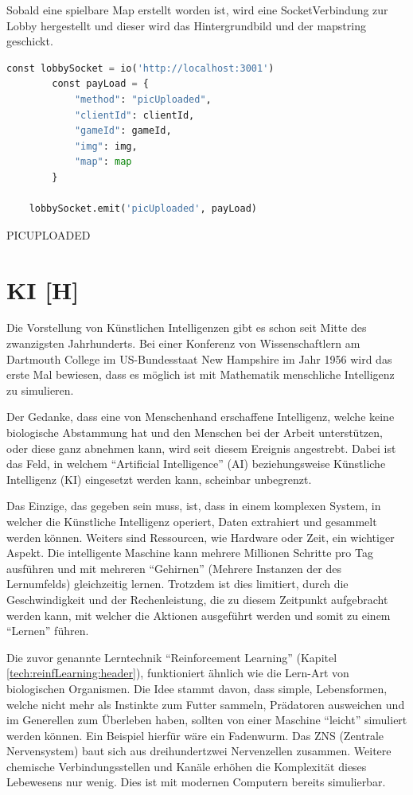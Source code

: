 Sobald eine spielbare Map erstellt worden ist, wird eine SocketVerbindung zur Lobby hergestellt und dieser wird das Hintergrundbild und der mapstring geschickt.

\begin{lstlisting}[language=Python,caption=Map wird an Lobby geschickt]
    const lobbySocket = io('http://localhost:3001')
        const payLoad = {
            "method": "picUploaded",
            "clientId": clientId,
            "gameId": gameId,
            "img": img,
            "map": map
        }

    lobbySocket.emit('picUploaded', payLoad)
\end{lstlisting}

PICUPLOADED

\section{KI [H]}\label{maai:ai:title}
Die Vorstellung von Künstlichen Intelligenzen gibt es schon seit Mitte des zwanzigsten Jahrhunderts. Bei einer Konferenz von Wissenschaftlern am Dartmouth College im US-Bundesstaat New Hampshire im Jahr 1956 wird das erste Mal bewiesen, dass es möglich ist mit Mathematik menschliche Intelligenz zu simulieren.

Der Gedanke, dass eine von Menschenhand erschaffene Intelligenz, welche keine biologische Abstammung hat und den Menschen bei der Arbeit unterstützen, oder diese ganz abnehmen kann, wird seit diesem Ereignis angestrebt. Dabei ist das Feld, in welchem ``Artificial Intelligence'' (AI) beziehungsweise Künstliche Intelligenz (KI) eingesetzt werden kann, scheinbar unbegrenzt.

Das Einzige, das gegeben sein muss, ist, dass in einem komplexen System, in welcher die Künstliche Intelligenz operiert, Daten extrahiert und gesammelt werden können. Weiters sind Ressourcen, wie Hardware oder Zeit, ein wichtiger Aspekt. Die intelligente Maschine kann mehrere Millionen Schritte pro Tag ausführen und mit mehreren ``Gehirnen'' (Mehrere Instanzen der des Lernumfelds) gleichzeitig lernen. Trotzdem ist dies limitiert, durch die Geschwindigkeit und der Rechenleistung, die zu diesem Zeitpunkt aufgebracht werden kann, mit welcher die Aktionen ausgeführt werden und somit zu einem ``Lernen'' führen.

Die zuvor genannte Lerntechnik ``Reinforcement Learning'' (Kapitel \ref{tech:reinfLearning:header}), funktioniert ähnlich wie die Lern-Art von biologischen Organismen. Die Idee stammt davon, dass simple, Lebensformen, welche nicht mehr als Instinkte zum Futter sammeln, Prädatoren ausweichen und im Generellen zum Überleben haben, sollten von einer Maschine ``leicht'' simuliert werden können. Ein Beispiel hierfür wäre ein Fadenwurm. Das ZNS (Zentrale Nervensystem) baut sich aus dreihundertzwei Nervenzellen zusammen. Weitere chemische Verbindungsstellen und Kanäle erhöhen die Komplexität dieses Lebewesens nur wenig. Dies ist mit modernen Computern bereits simulierbar.


